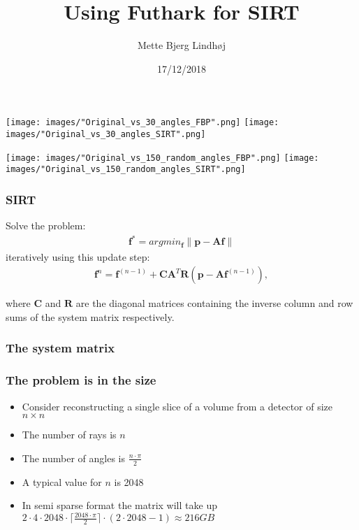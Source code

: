 \documentclass{beamer}
\title[SIRT]{Using Futhark for SIRT} %
\author{Mette Bjerg Lindh\o j} %
\institute[DRCMR] %
{
University of Copenhagen\\ %
}
\date{17/12/2018} %
\newcommand{\norm}[1]{\left\lVert#1\right\rVert}
\renewcommand{\vec}[1]{\ensuremath{\boldsymbol{#1}}}
\newcommand{\mat}[1]{\ensuremath{\boldsymbol{#1}}}
\newcommand{\inputTikZ}[2]{%
     \scalebox{#1}{}
}
\begin{document}
\begin{frame}
\titlepage %
\end{frame}

\begin{frame}
\centering
\texttt{[image: images/"Original\_vs\_30\_angles\_FBP".png]}
\texttt{[image: images/"Original\_vs\_30\_angles\_SIRT".png]}
\end{frame}

\begin{frame}
\centering
\texttt{[image: images/"Original\_vs\_150\_random\_angles\_FBP".png]}
\texttt{[image: images/"Original\_vs\_150\_random\_angles\_SIRT".png]}
\end{frame}

\begin{frame}
\frametitle{SIRT}
Solve the problem:
\begin{align}
\vec{f}^{\ast}=argmin_{\vec{f}}\norm{\vec{p}-\mat{A}\vec{f}}
\end{align}
iteratively using this update step:
\begin{align}
\vec{f}^{n} = \vec{f}^{(n-1)}+\mat{C}\mat{A}^{T}\mat{R}(\vec{p}-\mat{A}\vec{f}^{(n-1)}),
\end{align}

where $\mat{C}$ and $\mat{R}$ are the diagonal matrices containing the inverse column and row sums of the system matrix respectively.
\end{frame}

\begin{frame}
\frametitle{The system matrix}
\inputTikZ{0.6}{figures/weightings.tex}
\end{frame}

\begin{frame}
\frametitle{The problem is in the size}
\begin{itemize}
\item{Consider reconstructing a single slice of a volume from a detector of size $n\times n$}
\item{The number of rays is $n$}
\item{The number of angles is $\frac{n\cdot\pi}{2}$}
\item{A typical value for $n$ is 2048 }
\item{In semi sparse format the matrix will take up $2\cdot4\cdot2048\cdot\lceil\frac{2048\cdot\pi}{2}\rceil\cdot (2\cdot2048-1)\approx 216GB$}
\end{itemize}
\end{frame}
\end{document}
